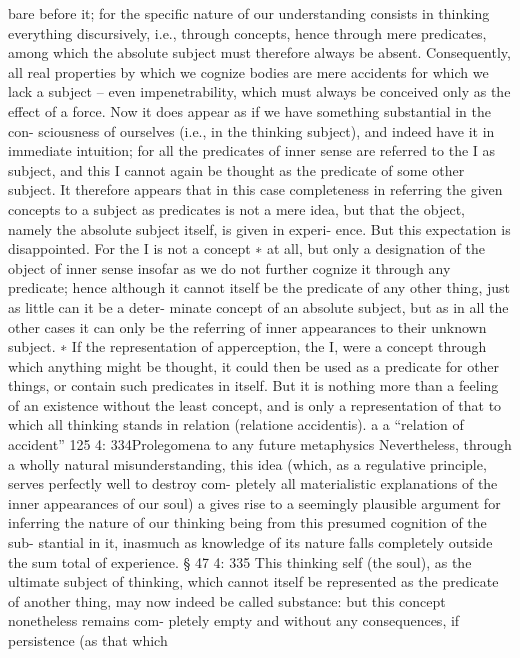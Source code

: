 bare before it; for the speciﬁc nature of our understanding consists in
thinking everything discursively, i.e., through concepts, hence through
mere predicates, among which the absolute subject must therefore always
be absent. Consequently, all real properties by which we cognize bodies
are mere accidents for which we lack a subject – even impenetrability,
which must always be conceived only as the effect of a force.
Now it does appear as if we have something substantial in the con-
sciousness of ourselves (i.e., in the thinking subject), and indeed have it
in immediate intuition; for all the predicates of inner sense are referred
to the I as subject, and this I cannot again be thought as the predicate of
some other subject. It therefore appears that in this case completeness in
referring the given concepts to a subject as predicates is not a mere idea,
but that the object, namely the absolute subject itself, is given in experi-
ence. But this expectation is disappointed. For the I is not a concept ∗ at
all, but only a designation of the object of inner sense insofar as we do
not further cognize it through any predicate; hence although it cannot
itself be the predicate of any other thing, just as little can it be a deter-
minate concept of an absolute subject, but as in all the other cases it can
only be the referring of inner appearances to their unknown subject.
∗ If the representation of apperception, the I, were a concept through which
anything might be thought, it could then be used as a predicate for other
things, or contain such predicates in itself. But it is nothing more than a feeling
of an existence without the least concept, and is only a representation of that
to which all thinking stands in relation (relatione accidentis). a
a “relation of accident”
125
4: 334Prolegomena to any future metaphysics
Nevertheless, through a wholly natural misunderstanding, this idea
(which, as a regulative principle, serves perfectly well to destroy com-
pletely all materialistic explanations of the inner appearances of our
soul) a gives rise to a seemingly plausible argument for inferring the
nature of our thinking being from this presumed cognition of the sub-
stantial in it, inasmuch as knowledge of its nature falls completely outside
the sum total of experience.
§ 47
4: 335
This thinking self (the soul), as the ultimate subject of thinking, which
cannot itself be represented as the predicate of another thing, may now
indeed be called substance: but this concept nonetheless remains com-
pletely empty and without any consequences, if persistence (as that which

